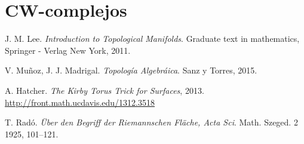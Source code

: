 \documentclass[10pt]{report}
\theoremstyle{definition}
\begin{document}
\chapter{CW-complejos}

\begin{thebibliography}{9}

J. M. Lee.
\textit{Introduction to Topological Manifolds}. Graduate text in mathematics, Springer - Verlag New York, 2011.

V. Muñoz, J. J. Madrigal. 
\textit{Topología Algebráica}. Sanz y Torres, 2015.


A. Hatcher.
\textit{The Kirby Torus Trick for Surfaces}, 2013.
\\\url{http://front.math.ucdavis.edu/1312.3518}


T. Radó.
\textit{Über den Begriff der Riemannschen Fläche, Acta Sci}. Math. Szeged. 2 1925,
101–121.


\end{thebibliography}
\end{document}
